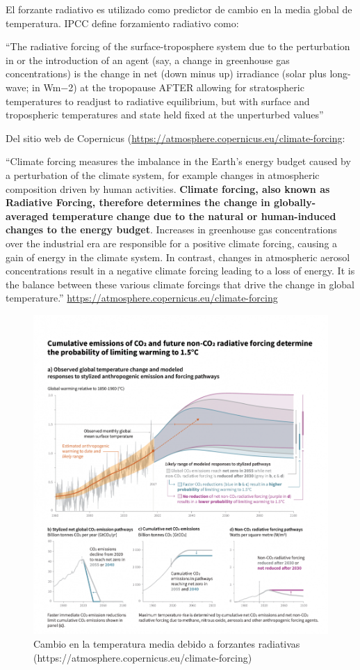 \documentclass[]{book}
\begin{document}
El forzante radiativo es utilizado como predictor de cambio en la media global de temperatura. IPCC \citep{schimel1996radiative} define forzamiento radiativo como:

``The radiative forcing of the surface-troposphere system due to the perturbation in or the introduction of an agent
(say, a change in greenhouse gas concentrations) is the change in net (down minus up) irradiance (solar plus long-wave; in Wm−2) at the tropopause AFTER allowing for stratospheric temperatures to readjust to radiative equilibrium, but with surface and tropospheric temperatures and state held fixed at the unperturbed values'' \citep{schimel1996radiative}

Del sitio web de Copernicus (\url{https://atmosphere.copernicus.eu/climate-forcing}:

``Climate forcing measures the imbalance in the Earth's energy budget caused by a perturbation of the climate system, for example changes in atmospheric composition driven by human activities. \textbf{Climate forcing, also known as Radiative Forcing, therefore determines the change in globally-averaged temperature change due to the natural or human-induced changes to the energy budget}. Increases in greenhouse gas concentrations over the industrial era are responsible for a positive climate forcing, causing a gain of energy in the climate system. In contrast, changes in atmospheric aerosol concentrations result in a negative climate forcing leading to a loss of energy. It is the balance between these various climate forcings that drive the change in global temperature.'' \url{https://atmosphere.copernicus.eu/climate-forcing}

\begin{figure}
\includegraphics[width=1.2\linewidth]{figs/SPM1_figure-final-947x1024} \caption{Cambio en la temperatura media debido a forzantes radiativas (https://atmosphere.copernicus.eu/climate-forcing)}\label{fig:unnamed-chunk-16}
\end{figure}
\end{document}
